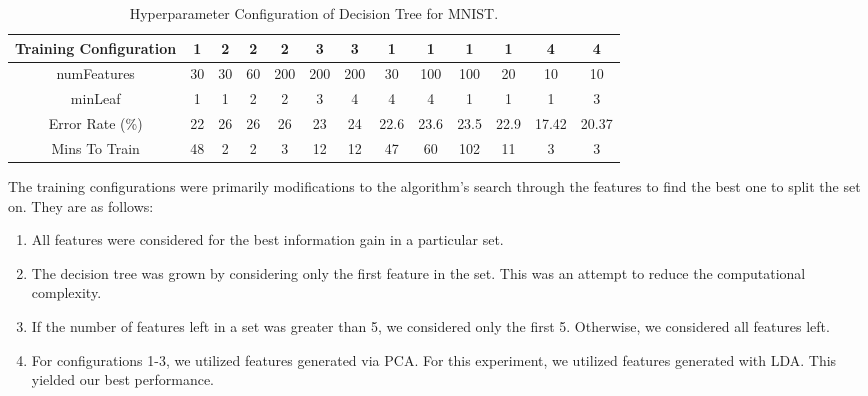 \begin{table}[H]
  \centering
  \begin{tabular}{||c | c | c | c | c | c | c | c | c | c | c | c | c ||} 
    \hline
    Training Configuration & 1 & 2 & 2 & 2 & 3 & 3 & 1 & 1 & 1 & 1 & 4 & 4 \\
    \hline
    numFeatures & 30 & 30 & 60 & 200 & 200 & 200 & 30 & 100 & 100 &  20 & 10 & 10 \\
    \hline
    minLeaf & 1 & 1 & 2 & 2 & 3 & 4 & 4 & 4 & 1 & 1 & 1 & 3 \\
    \hline
    Error Rate (\%) & 22 & 26 & 26 & 26 & 23 & 24 & 22.6 & 23.6 & 23.5 & 22.9 & 17.42 & 20.37 \\
    \hline
    Mins To Train & 48 & 2 & 2 & 3 & 12 & 12 & 47 & 60 & 102 & 11 & 3 & 3 \\
    \hline
  \end{tabular}
  \caption{Hyperparameter Configuration of Decision Tree for MNIST.}
\end{table}

The training configurations were primarily modifications to the algorithm's search through the features to find the best one to split the set on. They are as follows:

%
\begin{enumerate}
\item All features were considered for the best information gain in a particular set.
\item The decision tree was grown by considering only the first feature in the set. This was an attempt to reduce the computational complexity.
\item If the number of features left in a set was greater than 5, we considered only the first 5. Otherwise, we considered all features left. 
\item For configurations 1-3, we utilized features generated via PCA. For this experiment, we utilized features generated with LDA. This yielded our best performance.
\end{enumerate}
